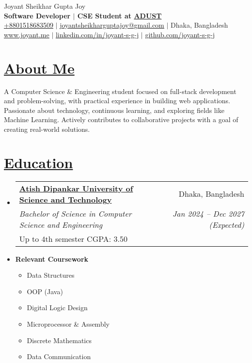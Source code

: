 \documentclass[a4paper, 11pt]{article}
\newcommand{\resumeSection}[2]{
  \section{\textbf{\href{#1}{#2}}}
}
\newcommand{\resumeEduSubheading}[6]{
  \vspace{-2pt}\item
    \begin{tabularx}{\textwidth}[t]{X r}
      \textbf{\href{#1}{#2}} & #3 \\
      {\textit{\small #4}} & \textit{\small #5} \\
      {\small #6}
    \end{tabularx}\vspace{-7pt}
}
\newcommand{\resumeCourseheading}[1]{
  \vspace{-2pt}\item
    \textbf{#1}\vspace{-7pt} \\
}
\newcommand{\resumeCoursework}[1]{
  \vspace{2pt}
  \begin{multicols}{3}
    \begin{itemize}[leftmargin=*, label=\textbullet, itemsep=2pt]
      #1
    \end{itemize}
  \end{multicols}
}
\newcommand{\resumeSubHeadingListStart}{\begin{itemize}[leftmargin=0in, label={}]}
\newcommand{\resumeSubHeadingListEnd}{\end{itemize}}
\begin{document}
{\Huge \rmfamily Joyant Sheikhar Gupta Joy} \\ \vspace{1pt}
\small \textbf{Software Developer $|$ CSE Student at \href{https://www.adust.edu.bd/}{ADUST}} \\ \vspace{2pt}
\href{tel:+8801518683509}{\underline{+8801518683509}} $|$ 
\href{mailto:joyantsheikharguptajoy@gmail.com}{\underline{joyantsheikharguptajoy@gmail.com}} $|$ 
Dhaka, Bangladesh \\ \vspace{1pt}
\href{https://joyant.me/}{\underline{www.joyant.me}} $|$
\href{https://www.linkedin.com/in/joyant-s-g-j/}{\underline{linkedin.com/in/joyant-s-g-j}} $|$
\href{https://github.com/joyant-s-g-j}{\underline{github.com/joyant-s-g-j}}

\resumeSection{https://joyant.me/about}{About Me}
    A Computer Science \& Engineering student focused on full-stack development and problem-solving, with practical experience in building web applications. Passionate about technology, continuous learning, and exploring fields like Machine Learning. Actively contributes to collaborative projects with a goal of creating real-world solutions.
\resumeSection{https://joyant.me/education}{Education}
  \resumeSubHeadingListStart
    \resumeEduSubheading
        {https://www.adust.edu.bd/\#}{Atish Dipankar University of Science and Technology}{Dhaka, Bangladesh}
        {Bachelor of Science in Computer Science and Engineering }{Jan 2024 -- Dec 2027 (Expected)}
        {Up to 4th semester CGPA: 3.50}
    \resumeCourseheading{Relevant Coursework}
        \resumeCoursework{
            \item Data Structures
            \item OOP (Java)
            \item Digital Logic Design
            \item Microprocessor \& Assembly
            \item Discrete Mathematics
            \item Data Communication
        }
  \resumeSubHeadingListEnd
\end{document}
